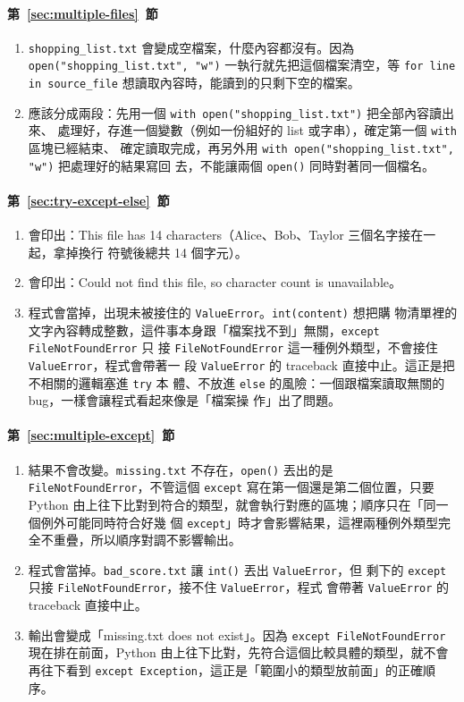 \paragraph{第~\ref{sec:multiple-files}~節}
\begin{enumerate}
\item \texttt{shopping\_list.txt} 會變成空檔案，什麼內容都沒有。因為
\texttt{open("shopping\_list.txt", "w")} 一執行就先把這個檔案清空，等 \texttt{for line
in source\_file} 想讀取內容時，能讀到的只剩下空的檔案。
\item 應該分成兩段：先用一個 \texttt{with open("shopping\_list.txt")} 把全部內容讀出來、
處理好，存進一個變數（例如一份組好的 list 或字串），確定第一個 \texttt{with} 區塊已經結束、
確定讀取完成，再另外用 \texttt{with open("shopping\_list.txt", "w")} 把處理好的結果寫回
去，不能讓兩個 \texttt{open()} 同時對著同一個檔名。
\end{enumerate}

\paragraph{第~\ref{sec:try-except-else}~節}
\begin{enumerate}
\item 會印出：This file has 14 characters（Alice、Bob、Taylor 三個名字接在一起，拿掉換行
符號後總共 14 個字元）。
\item 會印出：Could not find this file, so character count is unavailable。
\item 程式會當掉，出現未被接住的 \texttt{ValueError}。\texttt{int(content)} 想把購
物清單裡的文字內容轉成整數，這件事本身跟「檔案找不到」無關，\texttt{except FileNotFoundError} 只
接 \texttt{FileNotFoundError} 這一種例外類型，不會接住 \texttt{ValueError}，程式會帶著一
段 \texttt{ValueError} 的 traceback 直接中止。這正是把不相關的邏輯塞進 \texttt{try} 本
體、不放進 \texttt{else} 的風險：一個跟檔案讀取無關的 bug，一樣會讓程式看起來像是「檔案操
作」出了問題。
\end{enumerate}

\paragraph{第~\ref{sec:multiple-except}~節}
\begin{enumerate}
\item 結果不會改變。\texttt{missing.txt} 不存在，\texttt{open()} 丟出的是
\texttt{FileNotFoundError}，不管這個 \texttt{except} 寫在第一個還是第二個位置，只要
Python 由上往下比對到符合的類型，就會執行對應的區塊；順序只在「同一個例外可能同時符合好幾
個 \texttt{except}」時才會影響結果，這裡兩種例外類型完全不重疊，所以順序對調不影響輸出。
\item 程式會當掉。\texttt{bad\_score.txt} 讓 \texttt{int()} 丟出 \texttt{ValueError}，但
剩下的 \texttt{except} 只接 \texttt{FileNotFoundError}，接不住 \texttt{ValueError}，程式
會帶著 \texttt{ValueError} 的 traceback 直接中止。
\item 輸出會變成「missing.txt does not exist」。因為 \texttt{except FileNotFoundError}
現在排在前面，Python 由上往下比對，先符合這個比較具體的類型，就不會再往下看到
\texttt{except Exception}，這正是「範圍小的類型放前面」的正確順序。
\end{enumerate}

